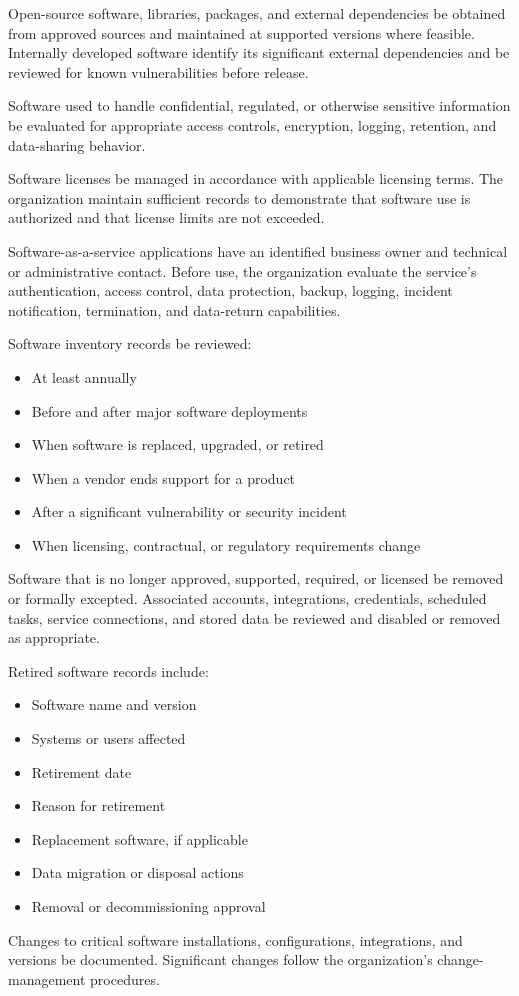 Open-source software, libraries, packages, and external dependencies \must{} be obtained from approved sources and maintained at supported versions where feasible. Internally developed software \must{} identify its significant external dependencies and \should{} be reviewed for known vulnerabilities before release.

Software used to handle confidential, regulated, or otherwise sensitive information \must{} be evaluated for appropriate access controls, encryption, logging, retention, and data-sharing behavior.

Software licenses \must{} be managed in accordance with applicable licensing terms. The organization \must{} maintain sufficient records to demonstrate that software use is authorized and that license limits are not exceeded.

Software-as-a-service applications \must{} have an identified business owner and technical or administrative contact. Before use, the organization \should{} evaluate the service's authentication, access control, data protection, backup, logging, incident notification, termination, and data-return capabilities.

Software inventory records \must{} be reviewed:
\begin{itemize}
    \item At least annually
    \item Before and after major software deployments
    \item When software is replaced, upgraded, or retired
    \item When a vendor ends support for a product
    \item After a significant vulnerability or security incident
    \item When licensing, contractual, or regulatory requirements change
\end{itemize}

Software that is no longer approved, supported, required, or licensed \must{} be removed or formally excepted. Associated accounts, integrations, credentials, scheduled tasks, service connections, and stored data \must{} be reviewed and disabled or removed as appropriate.

Retired software records \should{} include:
\begin{itemize}
    \item Software name and version
    \item Systems or users affected
    \item Retirement date
    \item Reason for retirement
    \item Replacement software, if applicable
    \item Data migration or disposal actions
    \item Removal or decommissioning approval
\end{itemize}

Changes to critical software installations, configurations, integrations, and versions \should{} be documented. Significant changes \must{} follow the organization's change-management procedures.